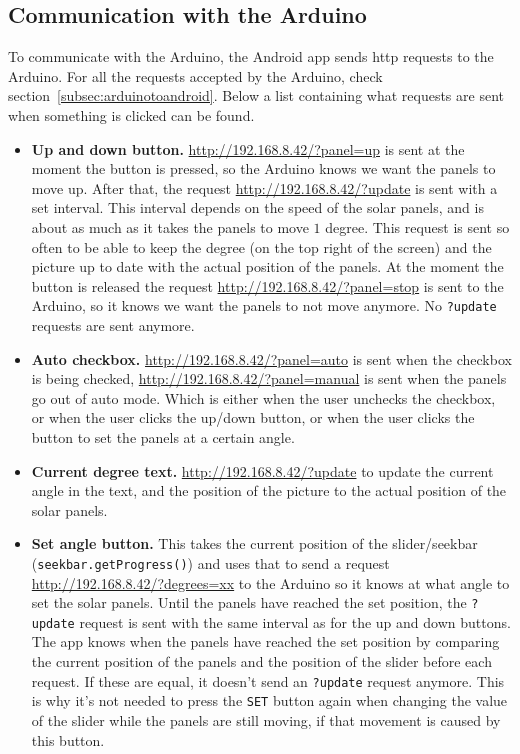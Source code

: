 \documentclass{article}
\newcommand{\ipaddress}{http://192.168.8.42}
\begin{document}
    \subsection{Communication with the Arduino}\label{subsec:communicationWithTheArduino}
    To communicate with the Arduino, the Android app sends http requests to the Arduino.
    For all the requests accepted by the Arduino, check section~\ref{subsec:arduinotoandroid}.
    Below a list containing what requests are sent when something is clicked can be found.
    \begin{itemize}
        \item \textbf{Up and down button.} \url{\ipaddress/?panel=up} is sent at the moment the button is pressed, so the Arduino knows we want the panels to move up.
        After that, the request \url{\ipaddress/?update} is sent with a set interval.
        This interval depends on the speed of the solar panels, and is about as much as it takes the panels to move $1$ degree.
        This request is sent so often to be able to keep the degree (on the top right of the screen) and the picture up to date with the actual position of the panels.
        At the moment the button is released the request \url{\ipaddress/?panel=stop} is sent to the Arduino, so it knows we want the panels to not move anymore.
        No \verb|?update| requests are sent anymore.

        \item \textbf{Auto checkbox.} \url{\ipaddress/?panel=auto} is sent when the checkbox is being checked, \url{\ipaddress/?panel=manual} is sent when the panels go out of auto mode.
        Which is either when the user unchecks the checkbox, or when the user clicks the up/down button, or when the user clicks the button to set the panels at a certain angle.

        \item \textbf{Current degree text.} \url{\ipaddress/?update} to update the current angle in the text, and the position of the picture to the actual position of the solar panels.

        \item \textbf{Set angle button.} This takes the current position of the slider/seekbar (\verb|seekbar.getProgress()|) and uses that to send a request \url{\ipaddress/?degrees=xx} to the Arduino so it knows at what angle to set the solar panels.
        Until the panels have reached the set position, the \verb|?update| request is sent with the same interval as for the up and down buttons.
        The app knows when the panels have reached the set position by comparing the current position of the panels and the position of the slider before each request.
        If these are equal, it doesn't send an \verb|?update| request anymore.
        This is why it's not needed to press the \verb|SET| button again when changing the value of the slider while the panels are still moving, if that movement is caused by this button.
    \end{itemize}
\end{document}
